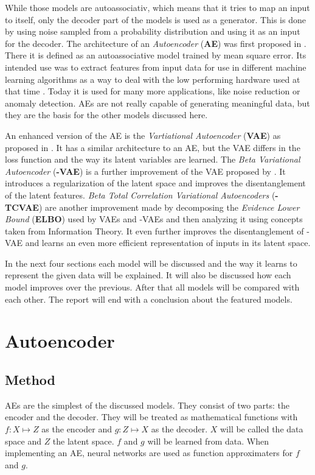 \documentclass[a4paper]{IEEEtran}
\begin{document}
While those models are autoassociativ, which means that it tries to map an input to itself, only the decoder part of the models is used as a generator. This is done by using noise sampled from a probability distribution and using it as an input for the decoder. The architecture of an \textit{Autoencoder} (\textbf{AE}) was first proposed in \cite{ballard1987modulalearning}. There it is defined as an autoassociative model trained by mean square error. Its intended use was to extract features from input data for use in different machine learning algorithms as a way to deal with the low performing hardware used at that time \cite{ballard1987modulalearning}. Today it is used for many more applications, like noise reduction or anomaly detection. AEs are not really capable of generating meaningful data, but they are the basis for the other models discussed here.

An enhanced version of the AE is the \textit{Vartiational Autoencoder} (\textbf{VAE}) as proposed in \cite{kingma2014autoencoding}. It has a similar architecture to an AE, but the VAE differs in the loss function and the way its latent variables are learned. The \textit{Beta Variational Autoencoder} (\textbf{\textbeta -VAE}) is a further improvement of the VAE proposed by \cite{higgins2017vae}. It introduces a regularization of the latent space and improves the disentanglement of the latent features. \textit{Beta Total Correlation Variational Autoencoders} (\textbf{\textbeta -TCVAE}) \cite{chen2019isolating} are another improvement made by decomposing the \textit{Evidence Lower Bound} (\textbf{ELBO}) used by VAEs and \textbeta -VAEs and then analyzing it using concepts taken from Information Theory. It even further improves the disentanglement of \textbeta -VAE and learns an even more efficient representation of inputs in its latent space.

In the next four sections each model will be discussed and the way it learns to represent the given data will be explained. It will also be discussed how each model improves over the previous. After that all models will be compared with each other. The report will end with a conclusion about the featured models.

\section{Autoencoder}
\subsection{Method}
AEs are the simplest of the discussed models. They consist of two parts: the encoder and the decoder. They will be treated as mathematical functions with $f : X \mapsto Z$ as the encoder and $g : Z \mapsto X$ as the decoder. $X$ will be called the data space and $Z$ the latent space. $f$ and $g$ will be learned from data. When implementing an AE, neural networks are used as function approximaters for $f$ and $g$.
\end{document}

